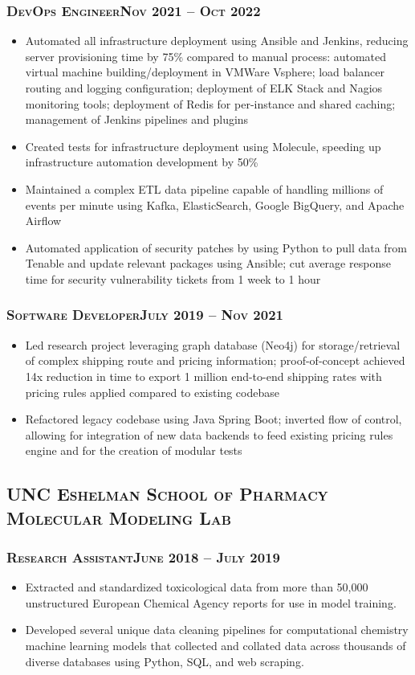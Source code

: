 \documentclass{article}
\newcommand{\institution}[1]{\subsection*{\scshape{#1}}}
\newcommand{\jobPosition}[3]{\subsubsection*{\scshape{#1}\hfill #2 -- #3}}
\begin{document}
    \jobPosition{DevOps Engineer}{Nov 2021}{Oct 2022}
    \begin{itemize}[noitemsep]
      \item
            Automated all infrastructure deployment using Ansible and
            Jenkins, reducing server provisioning time by 75\% compared to manual
            process: automated virtual machine building/deployment in VMWare
            Vsphere; load balancer routing and logging
            configuration; deployment of ELK Stack and Nagios monitoring tools;
            deployment of Redis for per-instance and shared caching; management of
            Jenkins pipelines and plugins
      \item
            Created tests for infrastructure deployment using Molecule,
            speeding up infrastructure automation development by 50\%
      \item
            Maintained a complex ETL data pipeline capable of handling
            millions of events per minute using Kafka, ElasticSearch, Google BigQuery,
            and Apache Airflow
      \item
            Automated application of security patches by using Python to
            pull data from Tenable and update relevant packages using Ansible; cut
            average response time for security vulnerability tickets from 1 week to
            1 hour
    \end{itemize}

    \jobPosition{Software Developer}{July 2019}{Nov 2021}
    \begin{itemize}[noitemsep]
      \item
            Led research project leveraging graph database (Neo4j) for
            storage/retrieval of complex shipping route and pricing information;
            proof-of-concept achieved 14x reduction in time to export 1 million
            end-to-end shipping rates with pricing rules applied compared to
            existing codebase
      \item
            Refactored legacy codebase using Java Spring Boot; inverted
            flow of control, allowing for integration of new data backends
            to feed existing pricing rules engine and for the creation of modular
            tests
    \end{itemize}

  \institution{UNC Eshelman School of Pharmacy Molecular Modeling Lab}

    \jobPosition{Research Assistant}{June 2018}{July 2019}
    \begin{itemize}[noitemsep]
      \item
            Extracted and standardized toxicological data from more
            than 50,000 unstructured European Chemical Agency reports
            for use in model training.
      \item
            Developed several unique data cleaning pipelines for
            computational chemistry machine learning models that collected and
            collated data across thousands of diverse databases using Python, SQL,
            and web scraping.
    \end{itemize}
\end{document}
